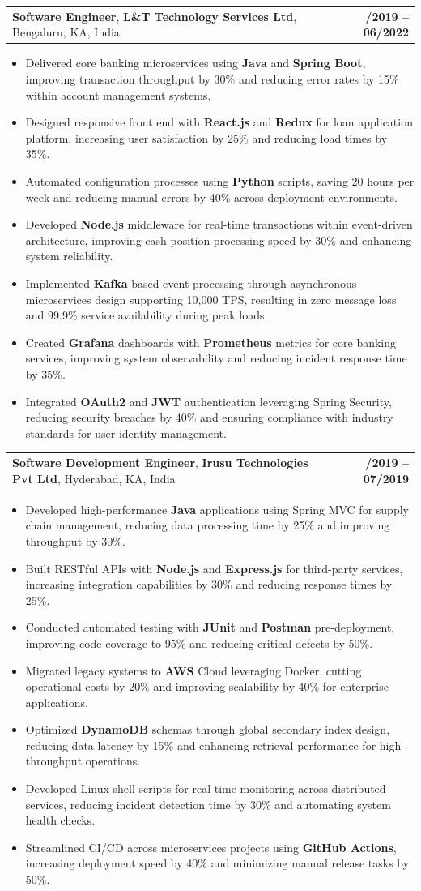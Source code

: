 \documentclass[letterpaper,11pt]{article}
\makeatletter
\newcommand{\resumeItem}[1]{
  \item\footnotesize{
    {#1 \vspace{-2pt}}
  }
}
\newcommand{\resumeSubheading}[4]{
  \vspace{-2pt}\item
    \begin{tabular*}{1.0\textwidth}[t]{l@{\extracolsep{\fill}}r}
      \textbf{\fontsize{10pt}{14pt}\selectfont #3}, \textbf{\fontsize{10pt}{14pt}\selectfont #1}, \fontsize{10pt}{14pt}\selectfont #4 & \textbf{\fontsize{10pt}{14pt}\selectfont #2} \\
    \end{tabular*}\vspace{-7pt}
}
\newcommand{\resumeItemListStart}{\begin{itemize}[leftmargin=*]}
\newcommand{\resumeItemListEnd}{\end{itemize}\vspace{-5pt}}
\makeatother
\begin{document}
    \resumeSubheading
        {L\&T Technology Services Ltd}{08/2019 -- 06/2022}
        {Software Engineer}{Bengaluru, KA, India}
      \resumeItemListStart
        \resumeItem{Delivered core banking microservices using \textbf{Java} and \textbf{Spring Boot}, improving transaction throughput by 30\% and reducing error rates by 15\% within account management systems.}
        \resumeItem{Designed responsive front end with \textbf{React.js} and \textbf{Redux} for loan application platform, increasing user satisfaction by 25\% and reducing load times by 35\%.}
        \resumeItem{Automated configuration processes using \textbf{Python} scripts, saving 20 hours per week and reducing manual errors by 40\% across deployment environments.}
        \resumeItem{Developed \textbf{Node.js} middleware for real-time transactions within event-driven architecture, improving cash position processing speed by 30\% and enhancing system reliability.}
        \resumeItem{Implemented \textbf{Kafka}-based event processing through asynchronous microservices design supporting 10,000 TPS, resulting in zero message loss and 99.9\% service availability during peak loads.}
        \resumeItem{Created \textbf{Grafana} dashboards with \textbf{Prometheus} metrics for core banking services, improving system observability and reducing incident response time by 35\%.}
        \resumeItem{Integrated \textbf{OAuth2} and \textbf{JWT} authentication leveraging Spring Security, reducing security breaches by 40\% and ensuring compliance with industry standards for user identity management.}
      \resumeItemListEnd

    \resumeSubheading
        {Irusu Technologies Pvt Ltd}{01/2019 -- 07/2019}
        {Software Development Engineer}{Hyderabad, KA, India}
      \resumeItemListStart
        \resumeItem{Developed high-performance \textbf{Java} applications using Spring MVC for supply chain management, reducing data processing time by 25\% and improving throughput by 30\%.}
        \resumeItem{Built RESTful APIs with \textbf{Node.js} and \textbf{Express.js} for third-party services, increasing integration capabilities by 30\% and reducing response times by 25\%.}
        \resumeItem{Conducted automated testing with \textbf{JUnit} and \textbf{Postman} pre-deployment, improving code coverage to 95\% and reducing critical defects by 50\%.}
        \resumeItem{Migrated legacy systems to \textbf{AWS} Cloud leveraging Docker, cutting operational costs by 20\% and improving scalability by 40\% for enterprise applications.}
        \resumeItem{Optimized \textbf{DynamoDB} schemas through global secondary index design, reducing data latency by 15\% and enhancing retrieval performance for high-throughput operations.}
        \resumeItem{Developed Linux shell scripts for real-time monitoring across distributed services, reducing incident detection time by 30\% and automating system health checks.}
        \resumeItem{Streamlined CI/CD across microservices projects using \textbf{GitHub Actions}, increasing deployment speed by 40\% and minimizing manual release tasks by 50\%.}
      \resumeItemListEnd
\end{document}
